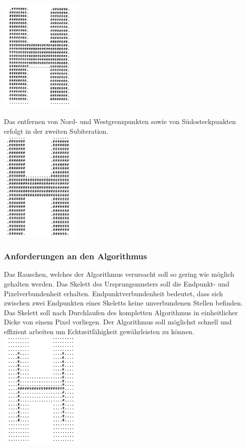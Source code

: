 \includegraphics[width=4cm]{Res/SuedOst.png}


Das entfernen von Nord- und Westgrenzpunkten sowie von Südosteckpunkten erfolgt in der zweiten Subiteration.\\

\includegraphics[width=4cm]{Res/NordWest.png}

\subsubsection{Anforderungen an den Algorithmus}

Das Rauschen, welches der Algorithmus verursacht soll so gering wie möglich gehalten werden.
Das Skelett des Ursprungsmusters soll die Endpunkt- und Pixelverbundenheit erhalten.
Endpunktverbundenheit bedeutet, dass sich zwischen zwei Endpunkten eines Skeletts keine unverbundenen Stellen befinden.
Das Skelett soll nach Durchlaufen des kompletten Algorithmus in einheitlicher Dicke von einem Pixel vorliegen.
Der Algorithmus soll möglichst schnell und effizient arbeiten um Echtzeitfähigkeit gewährleisten zu können.\\


\includegraphics[width=4cm]{Res/Skelett.png}

